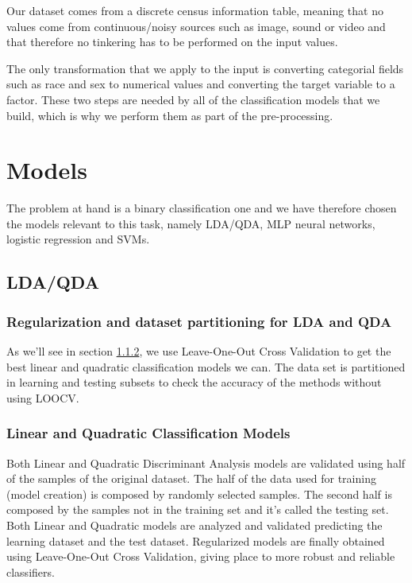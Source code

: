 \documentclass[english]{scrartcl}
\begin{document}
Our dataset comes from a discrete census information table, meaning that no values come from continuous/noisy sources such as image, sound or video and that therefore no tinkering has to be performed on the input values.

The only transformation that we apply to the input is converting categorial fields such as race and sex to numerical values and converting the target variable to a factor. These two steps are needed by all of the classification models that we build, which is why we perform them as part of the pre-processing.

\section{Models}

The problem at hand is a binary classification one and we have therefore chosen the models relevant to this task, namely LDA/QDA, MLP neural networks, logistic regression and SVMs.

    \subsection{LDA/QDA}
    
    \subsubsection{Regularization and dataset partitioning for LDA and QDA}
    As we'll see in section \ref{sec:methods:ldaqda}, we use Leave-One-Out Cross Validation to get the best linear and quadratic classification models we 
    can. The data set is partitioned in learning and testing subsets to check the accuracy of the methods without using LOOCV.
    
    \subsubsection{Linear and Quadratic Classification Models}
    \label{sec:methods:ldaqda}
    Both Linear and Quadratic Discriminant Analysis models are validated using
    half of the samples of the original dataset. The half of the data used for training (model creation) is composed by
    randomly selected samples. The second half is composed by the samples not in the training set and it's called the 
    testing set. Both Linear and Quadratic models are analyzed and validated predicting the learning dataset and the test
    dataset. Regularized models are finally obtained using Leave-One-Out Cross Validation, giving place to more robust
    and reliable classifiers.
    
\end{document}
